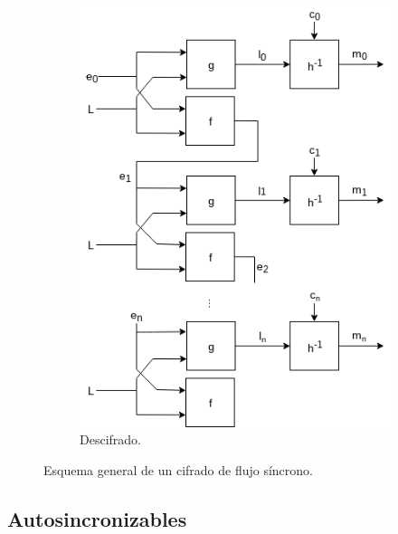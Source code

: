 \begin{figure}[H]
\begin{subfigure}{0.45\textwidth}
\begin{center}
      \includegraphics[width=0.9\linewidth]
        {contenidos/antecedentes/cifrados_de_flujo/diagramas/sincrono_descifrado.png}
      \caption{Descifrado.}
    \end{center}
  \end{subfigure}
  \caption{Esquema general de un cifrado de flujo síncrono.}
  \label{flujo_sincrono}
\end{figure}

\subsection{Autosincronizables}
